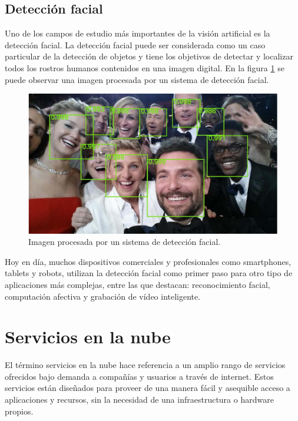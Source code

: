 
\subsection{Detección facial}
Uno de los campos de estudio más importantes de la visión artificial es la detección facial. La detección facial puede ser considerada como un caso particular de la detección de objetos y tiene los objetivos de detectar y localizar todos los rostros humanos contenidos en una imagen digital. En la figura \ref{fig:mv_fd} se puede observar una imagen procesada por un sistema de detección facial.

\begin{figure}[h]
	\centering
	\includegraphics[scale=0.5]{./Figures/mv_fd.jpeg}
	\caption{Imagen procesada por un sistema de detección facial.}
	\label{fig:mv_fd}
\end{figure}

Hoy en día, muchos dispositivos comerciales y profesionales como smartphones, tablets y robots, utilizan la detección facial como primer paso para otro tipo de aplicaciones más complejas, entre las que destacan: reconocimiento facial, computación afectiva y grabación de vídeo inteligente.

\section{Servicios en la nube}
El término servicios en la nube hace referencia a un amplio rango de servicios ofrecidos bajo demanda a compañías y usuarios a través de internet. Estos servicios están diseñados para proveer de una manera fácil y asequible acceso a aplicaciones y recursos, sin la necesidad de una infraestructura o hardware propios.

